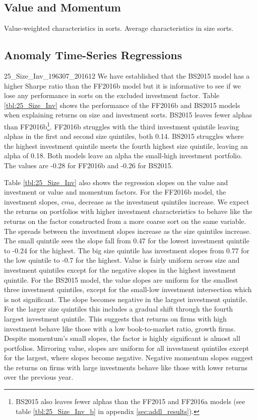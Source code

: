 \subsection{Value and Momentum}

Value-weighted characteristics in sorts.
Average characteristics in size sorts.

\subsection{Anomaly Time-Series Regressions}

{25_Size_Inv_196307_201612}
We have established that the BS2015 model has a higher Sharpe ratio than the FF2016b model but 
it is informative to see if we lose any performance in sorts on the excluded investment factor.
Table \ref{tbl:25_Size_Inv} shows the performance of the FF2016b and BS2015 models when 
explaining returns on size and investment sorts.
BS2015 leaves fewer alphas than FF2016b\footnote{BS2015 also leaves fewer alphas than the 
FF2015 and FF2016a models (see table \ref{tbl:25_Size_Inv_b} in appendix 
\ref{sec:addl_results}).}.
FF2016b struggles with the third investment quintile leaving alphas in the first and second 
size quintiles, both 0.14.
BS2015 struggles where the highest investment quintile meets the fourth highest size quintile, 
leaving an alpha of 0.18.
Both models leave an alpha the small-high investment portfolio.
The values are -0.28 for FF2016b and -0.26 for BS2015.

Table \ref{tbl:25_Size_Inv} also shows the regression slopes on the value and investment or 
value and momentum factors.
For the FF2016b model, the investment slopes, $cma$, decrease as the investment quintiles 
increase.
We expect the returns on portfolios with higher investment characteristics to behave like the 
returns on the factor constructed from a more coarse sort on the same variable.
The spreads between the investment slopes increase as the size quintiles increase.
The small quintile sees the slope fall from 0.47 for the lowest investment quintile to -0.24 
for the highest.
The big size quintile has investment slopes from 0.77 for the low quintile to -0.7 for the 
highest.
Value is fairly uniform across size and investment quintiles except for the negative slopes in 
the highest investment quintile.
For the BS2015 model, the value slopes are uniform for the smallest three investment 
quintiles, except for the small-low investment intersection which is not significant.
The slope becomes negative in the largest investment quintile.
For the larger size quintiles this includes a gradual shift through the fourth largest 
investment quintile.
This suggests that returns on firms with high investment behave like those with a low 
book-to-market ratio, growth firms.
Despite momentum's small slopes, the factor is highly significant is almost all portfolios.
Mirroring value, slopes are uniform for all investment quintiles except for the largest, where 
slopes become negative.
Negative momentum slopes suggest the returns on firms with large investments behave like those 
with lower returns over the previous year.

